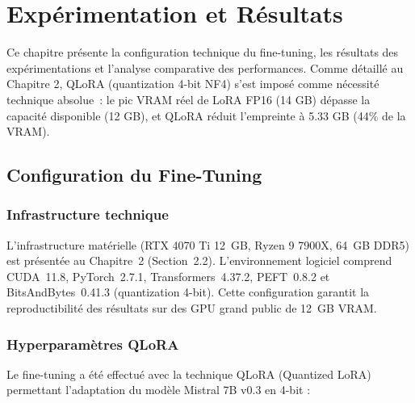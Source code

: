 
\chapter{Expérimentation et Résultats}

Ce chapitre présente la configuration technique du fine-tuning, les résultats des expérimentations et l'analyse comparative des performances. Comme détaillé au Chapitre 2, QLoRA (quantization 4-bit NF4) s'est imposé comme nécessité technique absolue~: le pic VRAM réel de LoRA FP16 (14 GB) dépasse la capacité disponible (12 GB), et QLoRA réduit l'empreinte à 5.33 GB (44\% de la VRAM).

\section{Configuration du Fine-Tuning}

\subsection{Infrastructure technique}

L'infrastructure matérielle (RTX 4070 Ti 12~GB, Ryzen 9 7900X, 64~GB DDR5) est présentée au Chapitre~2 (Section~2.2). L'environnement logiciel comprend CUDA~11.8, PyTorch~2.7.1, Transformers~4.37.2, PEFT~0.8.2 et BitsAndBytes~0.41.3 (quantization 4-bit). Cette configuration garantit la reproductibilité des résultats sur des GPU grand public de 12~GB VRAM.

\subsection{Hyperparamètres QLoRA}

Le fine-tuning a été effectué avec la technique QLoRA (Quantized LoRA) permettant l'adaptation du modèle Mistral 7B v0.3 en 4-bit :

